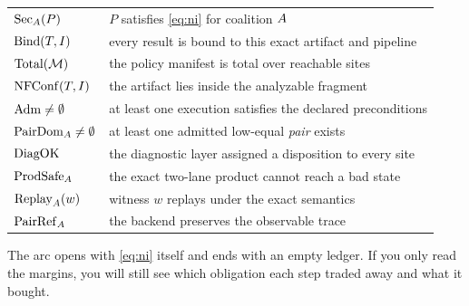 \begin{center}
\begin{tabular}{@{}ll@{}}
\toprule
$\mathrm{Sec}_A(P)$ & $P$ satisfies \eqref{eq:ni} for coalition $A$ \\
$\mathrm{Bind}(T,I)$ & every result is bound to this exact artifact and pipeline \\
$\mathrm{Total}(\mathcal{M})$ & the policy manifest is total over reachable sites \\
$\mathrm{NFConf}(T,I)$ & the artifact lies inside the analyzable fragment \\
$\mathrm{Adm} \neq \emptyset$ & at least one execution satisfies the declared preconditions \\
$\mathrm{PairDom}_A \neq \emptyset$ & at least one admitted low-equal \emph{pair} exists \\
$\mathrm{DiagOK}$ & the diagnostic layer assigned a disposition to every site \\
$\mathrm{ProdSafe}_A$ & the exact two-lane product cannot reach a bad state \\
$\mathrm{Replay}_A(w)$ & witness $w$ replays under the exact semantics \\
$\mathrm{PairRef}_A$ & the backend preserves the observable trace \\
\bottomrule
\end{tabular}
\end{center}

The arc opens with \eqref{eq:ni} itself and ends with an empty ledger. If you
only read the margins, you will still see which obligation each step traded
away and what it bought.
